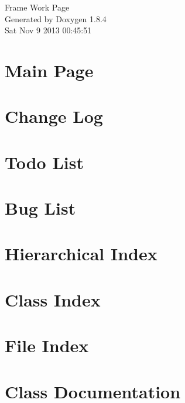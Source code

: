 \documentclass[twoside]{article}
\begin{document}
\hypersetup{pageanchor=false}
\begin{titlepage}
\vspace*{7cm}
\begin{center}%
{\Large Frame Work Page }\\
\vspace*{1cm}
{\large Generated by Doxygen 1.8.4}\\
\vspace*{0.5cm}
{\small Sat Nov 9 2013 00:45:51}\\
\end{center}
\end{titlepage}
\tableofcontents
{}
\hypersetup{pageanchor=true}

\section{Main Page}
\label{index}\hypertarget{index}{}
\section{Change Log}
\label{md_ChangeLog}
\hypertarget{md_ChangeLog}{}

\section{Todo List}
\label{todo}
\hypertarget{todo}{}

\section{Bug List}
\label{bug}
\hypertarget{bug}{}

\section{Hierarchical Index}

\section{Class Index}

\section{File Index}

\section{Class Documentation}































\end{document}
